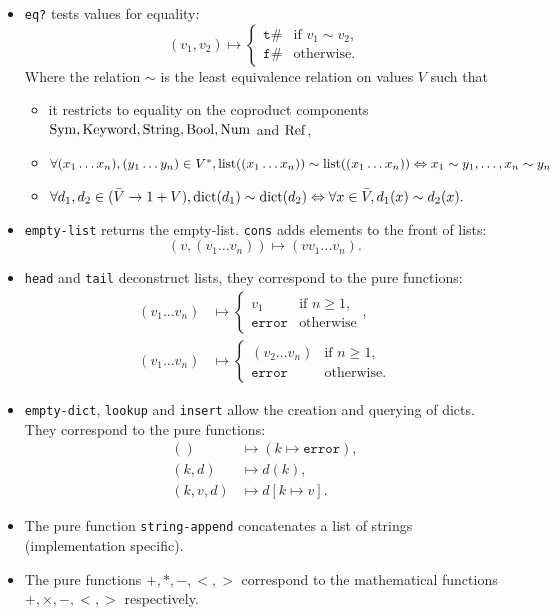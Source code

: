 \begin{itemize}
\item \texttt{eq?} tests values for equality:
  \[
    (v_1, v_2) \mapsto
    \begin{cases}
      \mathtt{t}\# & \text{if } v_1 \sim v_2,\\
      \mathtt{f}\# & \text{otherwise.}
    \end{cases}
  \]
  Where the relation $\sim$ is the least equivalence relation on values $V$ such
  that
  \begin{itemize}
  \item
    it restricts to equality on the coproduct components $\mathrm{Sym}, \mathrm{Keyword}, \mathrm{String},
    \mathrm{Bool}, \mathrm{Num}$ and $\mathrm{Ref}$,
  \item
    $\forall (x_1 \ldots x_n), (y_1 \ldots y_n) \in V^*, \mathrm{list}((x_1 \ldots
    x_n)) \sim \mathrm{list}((x_1 \ldots x_n)) \Leftrightarrow x_1 \sim y_1, \ldots, x_n
    \sim y_n$
  \item
    $\forall d_1, d_2 \in (\bar V \to 1 + V), \mathrm{dict}(d_1) \sim \mathrm{dict}(d_2)
    \Leftrightarrow \forall x \in \bar V, d_1(x) \sim d_2(x).$
  \end{itemize}
\item
  \texttt{empty-list} returns the empty-list.
  \texttt{cons} adds elements to the front of lists:
  \[
    (v, (v_1 \ldots v_n)) \mapsto (v v_1 \ldots v_n).
  \]
\item
  \texttt{head} and \texttt{tail} deconstruct lists, they correspond to the pure
  functions:
  \begin{align*}
    (v_1 \ldots v_n) &\mapsto
    \begin{cases}
      v_1 & \text{if } n \geq 1,\\
      \mathtt{error} & \text{otherwise}
    \end{cases},\\
    (v_1 \ldots v_n) &\mapsto
    \begin{cases}
      (v_2 \ldots v_n) & \text{if } n \geq 1,\\
      \mathtt{error} & \text{otherwise.}
    \end{cases}
  \end{align*}
\item \texttt{empty-dict}, \texttt{lookup} and \texttt{insert} allow the
  creation and querying of dicts. They correspond to the pure functions:
  \begin{align*}
    () &\mapsto (k \mapsto \mathtt{error}),\\
    (k, d) &\mapsto d(k),\\
    (k, v, d) &\mapsto d[k \mapsto v].
  \end{align*}
\item The pure function \texttt{string-append} concatenates a list of strings
  (implementation specific).
\item The pure functions $\mathtt{+}, \mathtt{*}, \mathtt{-}, \mathtt{<},
  \mathtt{>}$ correspond to the mathematical functions $+, \times, -, <, >$
  respectively.
\end{itemize}

